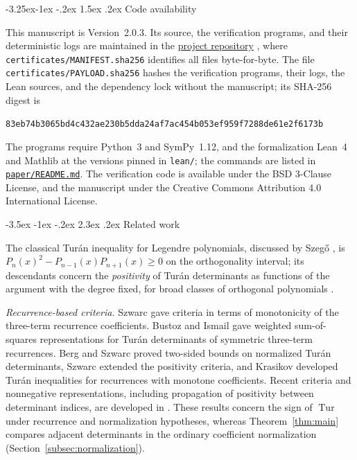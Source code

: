 \documentclass[twoside,10pt]{article}
\makeatletter
\numberwithin{equation}{section}
\theoremstyle{slbody}
\theoremstyle{definition}
\theoremstyle{remark}
\numberwithin{theorem}{section}
\DeclareMathOperator{\Tur}{Tur}
\renewcommand{\section}{%
  \@startsection{section}{1}{\z@}%
    {-3.5ex \@plus -1ex \@minus -.2ex}%
    {2.3ex \@plus .2ex}%
    {\normalfont\large\bfseries}}
\renewcommand{\subsection}{%
  \@startsection{subsection}{2}{\z@}%
    {-3.25ex\@plus -1ex \@minus -.2ex}%
    {1.5ex \@plus .2ex}%
    {\normalfont\normalsize\bfseries}}
\makeatother
\begin{document}
\subsection{Code availability}\label{subsec:availability}

This manuscript is Version~2.0.3.  Its source, the verification programs,
and their deterministic logs are maintained in the
\href{https://github.com/skypher/kraw}{project repository}
\cite{polzer2026artifact}, where
\texttt{certificates/\allowbreak MANIFEST.\allowbreak sha256} identifies all
files byte-for-byte.  The file
\texttt{certificates/\allowbreak PAYLOAD.\allowbreak sha256} hashes the
verification programs, their logs, the Lean sources, and the dependency lock
without the manuscript; its
SHA-256 digest is
\begin{center}
\small\nolinkurl{83eb74b3065bd4c432ae230b5dda24af7ac454b053ef959f7288de61e2f6173b}
\end{center}
The programs require Python~3 and SymPy~1.12, and the formalization Lean~4
and Mathlib at the versions pinned in \texttt{lean/}; the commands are
listed in
\href{https://github.com/skypher/kraw/blob/v2.0.3/paper/README.md}{\texttt{paper/README.md}}.
The verification code is available under the BSD 3-Clause License, and the
manuscript under the Creative Commons Attribution 4.0 International
License.

\section{Related work}\label{sec:related}

The classical Tur\'an inequality for Legendre polynomials, discussed by
Szeg\H{o} \cite{szego48}, is
$P_n(x)^2-P_{n-1}(x)P_{n+1}(x)\ge 0$ on the orthogonality interval; its
descendants concern the \emph{positivity} of Tur\'an determinants as
functions of the argument with the degree fixed, for broad classes of
orthogonal polynomials \cite{szego-book}.

\emph{Recurrence-based criteria.}  Szwarc \cite{szwarc98} gave criteria in
terms of monotonicity of the three-term recurrence coefficients.  Bustoz and
Ismail \cite[Section~2, Theorem~1, (2.3), p.~2]{bustozismail97} gave weighted
sum-of-squares representations for Tur\'an determinants of symmetric
three-term recurrences.  Berg and Szwarc \cite{bergszwarc09} proved
two-sided bounds on normalized Tur\'an determinants, Szwarc
\cite{szwarc20} extended the positivity criteria, and Krasikov
\cite{krasikov-recurrence} developed Tur\'an inequalities for recurrences
with monotone coefficients.  Recent criteria and nonnegative
representations, including propagation of positivity between determinant
indices, are developed in \cite{kahler26}.  These results concern the sign
of $\Tur$ under recurrence and normalization hypotheses, whereas
Theorem~\ref{thm:main} compares adjacent determinants in the ordinary
coefficient normalization (Section~\ref{subsec:normalization}).
\end{document}
